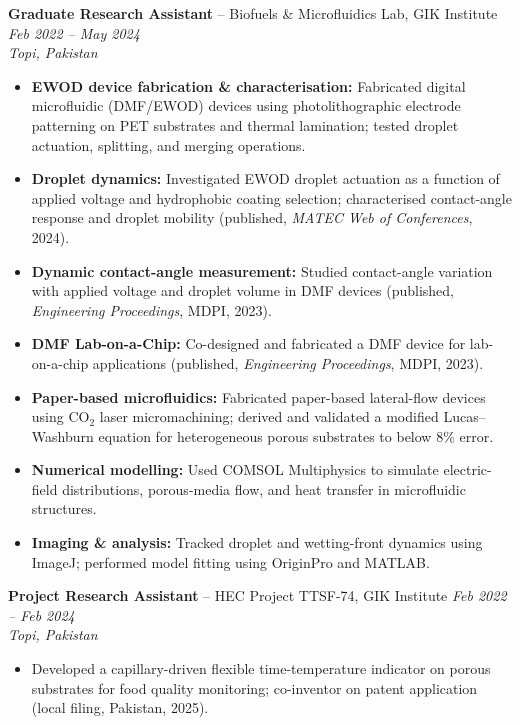 \documentclass[11pt,a4paper]{article}
\begin{document}
\textbf{Graduate Research Assistant} -- Biofuels \& Microfluidics Lab, GIK
Institute \hfill \textit{Feb 2022 -- May 2024}\\
\textit{Topi, Pakistan}
\begin{itemize}
  \item \textbf{EWOD device fabrication \& characterisation:} Fabricated digital
        microfluidic (DMF/EWOD) devices using photolithographic electrode
        patterning on PET substrates and thermal lamination; tested droplet
        actuation, splitting, and merging operations.
  \item \textbf{Droplet dynamics:} Investigated EWOD droplet actuation as a
        function of applied voltage and hydrophobic coating selection; characterised
        contact-angle response and droplet mobility (published,
        \textit{MATEC Web of Conferences}, 2024).
  \item \textbf{Dynamic contact-angle measurement:} Studied contact-angle variation
        with applied voltage and droplet volume in DMF devices (published,
        \textit{Engineering Proceedings}, MDPI, 2023).
  \item \textbf{DMF Lab-on-a-Chip:} Co-designed and fabricated a DMF device for
        lab-on-a-chip applications (published, \textit{Engineering Proceedings},
        MDPI, 2023).
  \item \textbf{Paper-based microfluidics:} Fabricated paper-based lateral-flow
        devices using CO$_2$ laser micromachining; derived and validated a modified
        Lucas--Washburn equation for heterogeneous porous substrates to below 8\%
        error.
  \item \textbf{Numerical modelling:} Used COMSOL Multiphysics to simulate
        electric-field distributions, porous-media flow, and heat transfer in
        microfluidic structures.
  \item \textbf{Imaging \& analysis:} Tracked droplet and wetting-front dynamics
        using ImageJ; performed model fitting using OriginPro and MATLAB.
\end{itemize}

\vspace{4pt}
\textbf{Project Research Assistant} -- HEC Project TTSF-74, GIK Institute
\hfill \textit{Feb 2022 -- Feb 2024}\\
\textit{Topi, Pakistan}
\begin{itemize}
  \item Developed a capillary-driven flexible time-temperature indicator on porous
        substrates for food quality monitoring; co-inventor on patent application
        (local filing, Pakistan, 2025).
\end{itemize}
\end{document}
